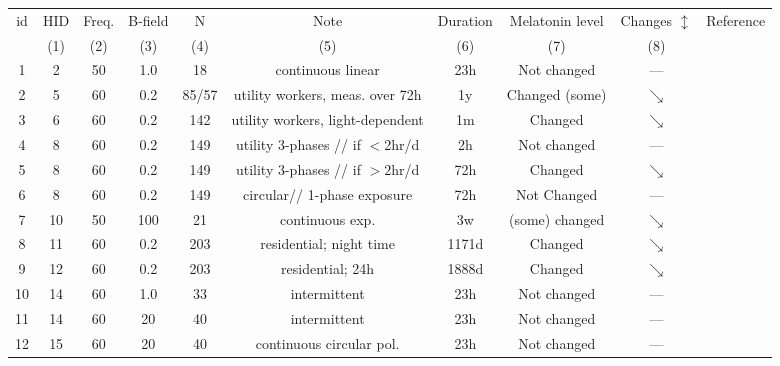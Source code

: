 \begin{tabular}{cccccccccc}
id & HID & Freq. & B-field &  N & Note & Duration & Melatonin level & Changes $\updownarrow$ & Reference \\
& (1) & (2) & (3) & (4) & (5)  & (6) & (7) & (8)\\
\hline
1& 2 & 50 & 1.0 & 18 &continuous linear & 23h & Not changed & --- &\citet{Akerstedt1999} \\
2& 5 & 60 & 0.2 & 85/57 & utility workers, meas. over 72h & 1y & Changed (some) &  $\searrow$  &\citet{Burch1998}\\
3& 6 & 60 & 0.2 &  142 &utility workers, light-dependent & 1m & Changed  & $\searrow$& \citet{Burch1999} \\
4& 8 & 60 & 0.2 & 149 & utility 3-phases  // if $<$2hr/d  & 2h & Not changed& --- & \citet{Burch2000} \\
5& 8 & 60 & 0.2 & 149 & utility 3-phases  // if  $>2$hr/d  & 72h & Changed & $\searrow$& \citet{Burch2000} \\
6& 8 & 60 & 0.2 & 149 & circular// 1-phase exposure & 72h & Not Changed & --- &\citet{Burch2000}\\
7& 10 & 50 & 100 & 21 &  continuous exp.  & 3w & (some) changed & $\searrow$& \citet{Crasson2001}\\
8& 11 & 60 & 0.2 & 203 & residential; night time & 1171d & Changed & $\searrow$&  \citet{Davis2001} \\
9& 12 & 60 & 0.2 & 203 &  residential; 24h & 1888d & Changed & $\searrow$& \citet{Davis2001} \\
10& 14 & 60 & 1.0 & 33  & intermittent & 23h & Not changed & --- &\citet{Graham1996} \\
11& 14 & 60 & 20 &  40 &  intermittent & 23h & Not changed & --- &\citet{Graham1996} \\
12& 15 & 60 & 20 & 40 & continuous circular pol. & 23h & Not changed & --- &\citet{Graham1997} \\

\end{tabular}
